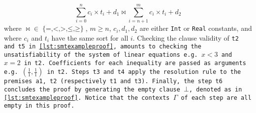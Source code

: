 \begin{equation}
\sum_{i=0}^{n}c_i\times{}t_i + d_1\bowtie \sum_{i=n+1}^{m} c_i\times{}t_i + d_2
\label{eqn:inequality}
\end{equation}
%
where $\mathop{\bowtie} \mathrel{\in} \mathop{\{=, <, >, \leq, \geq\}}$, $m\geq n$, $c_i, d_1, d_2$ are either \lstinline[language=SMT,basicstyle=\ttfamily\footnotesize]{Int} or \lstinline[language=SMT,basicstyle=\ttfamily\footnotesize]{Real}
constants, and where $c_i$ and $t_i$ have the same sort for all $i$.
Checking the clause validity of \tt{t2} and \tt{t5} in \cref{lst:smtexampleproof}, amounts to checking the unsatisfiability of the system of linear equations e.g. $x < 3$ and $x = 2$ in \tt{t2}.
Coefficients for each inequality are passed as arguments e.g. $(\frac{1}{1},\frac{1}{1})$ in \tt{t2}.
Steps \tt{t3} and \tt{t4} apply the \colorbox{purple!30}{\texttt{resolution}} rule to the premises \tt{a1}, \tt{t2} (respectively \tt{t1} and \tt{t3}).
Finally, the step \texttt{t6} concludes the proof by generating the empty clause $\bot$, denoted as  in \cref{lst:smtexampleproof}.
Notice that the contexts \colorbox{blue!30}{$\Gamma$} of each step are all empty in this proof.

